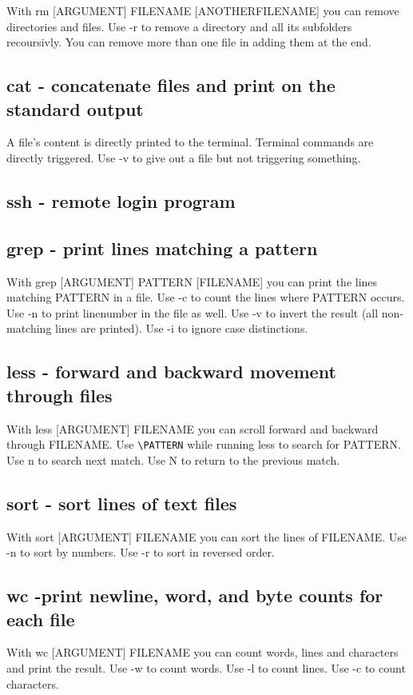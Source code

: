 \documentclass[10pt,a4paper]{scrartcl}
\begin{document}
With rm [ARGUMENT] FILENAME [ANOTHERFILENAME] you can remove directories and files. Use -r to remove a directory and all its subfolders recoursivly. You can remove more than one file in adding them at the end.

\subsection{cat - concatenate files and print on the standard output}

A file's content is directly printed to the terminal. Terminal commands are directly triggered. Use -v to give out a file but not triggering something.

\subsection{ssh - remote login program}

\subsection{grep - print lines matching a pattern}
With grep [ARGUMENT] PATTERN [FILENAME] you can print the lines matching PATTERN in a file. Use -c to count the lines where PATTERN occurs. Use -n to print linenumber in the file as well. Use -v to invert the result (all non-matching lines are printed). Use -i to ignore case distinctions.
\subsection{less - forward and backward movement through files}
With less [ARGUMENT] FILENAME you can scroll forward and backward through FILENAME. Use \verb$\PATTERN$ while running less to search for PATTERN. Use n to search next match. Use N to return to the previous match.

\subsection{sort - sort lines of text files}
With sort [ARGUMENT] FILENAME you can sort the lines of FILENAME. Use -n to sort by numbers. Use -r to sort in reversed order.

\subsection{wc -print newline, word, and byte counts for each file}
With wc [ARGUMENT] FILENAME you can count words, lines and characters and print the result. Use -w to count words. Use -l to count lines. Use -c to count characters.
\end{document}
